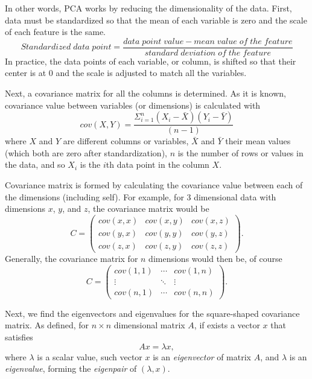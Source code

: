 In other words,
PCA works by reducing the dimensionality of the data.
First,
data must be standardized
so that the mean of each variable is zero
and the scale of each feature is the same.
\begin{equation}
    Standardized\; data\; point = \frac{data\; point\; value - mean\; value\; of\; the\; feature}{standard\; deviation\; of\; the\; feature}
\end{equation}
In practice,
the data points of each variable, or column,
is shifted so that their center is at 0
and the scale is adjusted to match all the variables.

Next, a covariance matrix for all the columns is determined.
As it is known,
covariance value between variables (or dimensions)
is calculated with
\begin{equation}
    cov(X,Y) = \frac{\Sigma_{i=1}^{n}(X_{i}-\bar{X})(Y_{i}-\bar{Y})}{(n-1)}
\end{equation}
where $X$ and $Y$ are different columns or variables,
$\bar{X}$ and $\bar{Y}$ their mean values (which both are zero after standardization),
$n$ is the number of rows or values in the data,
and so $X_{i}$ is the $i$th data point in the column $X$.~\cite{smith2002tutorial}

Covariance matrix is formed
by calculating the covariance value between each of the dimensions (including self).
For example,
for 3 dimensional data with dimensions $x$, $y$, and $z$, the
covariance matrix would be
\begin{equation}
    C =
    \begin{pmatrix}
        cov(x,x) & cov(x,y) & cov(x,z) \\
        cov(y,x) & cov(y,y) & cov(y,z) \\
        cov(z,x) & cov(z,y) & cov(z,z)
    \end{pmatrix}.
\end{equation}
Generally,
the covariance matrix for $n$ dimensions would then be, of course
\begin{equation}
    C =
    \begin{pmatrix}
        cov(1,1)    & \cdots    & cov(1,n)    \\
        \vdots      & \ddots    & \vdots        \\
        cov(n,1)    & \cdots    & cov(n,n)
    \end{pmatrix}.
\end{equation}

Next, we find the eigenvectors and eigenvalues
for the square-shaped covariance matrix.
As defined,
for $n\times n$ dimensional matrix $A$,
if exists a vector $x$ that satisfies
\begin{equation}
    Ax = \lambda x,
\end{equation}
where $\lambda$ is a scalar value,
such vector $x$ is an \textit{eigenvector} of matrix $A$,
and $\lambda$ is an \textit{eigenvalue},
forming the \textit{eigenpair} of $(\lambda,x)$.~\cite{borm2012numerical}

